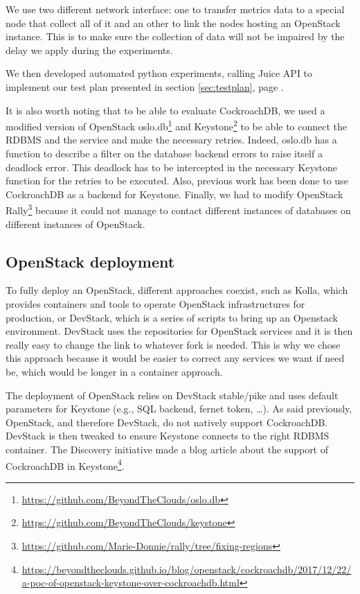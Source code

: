 We use two different network interface: one to transfer metrics data to a special node that collect all of it and an other to link the nodes hosting an OpenStack instance. This is to make sure the collection of data will not be impaired by the delay we apply during the experiments.

We then developed automated python experiments, calling Juice API to implement our test plan presented in section \ref{sec:testplan}, page \pageref{sec:testplan}.

It is also worth noting that to be able to evaluate CockroachDB, we used a modified version of OpenStack oslo.db\footnote{\url{https://github.com/BeyondTheClouds/oslo.db}} and Keystone\footnote{\url{https://github.com/BeyondTheClouds/keystone}} to be able to connect the RDBMS and the service and make the necessary retries. Indeed, oslo.db has a function to describe a filter on the database backend errors to raise itself a deadlock error. This deadlock has to be intercepted in the necessary Keystone function for the retries to be executed. Also, previous work has been done to use CockroachDB as a backend for Keystone. Finally, we had to modify OpenStack Rally\footnote{\url{https://github.com/Marie-Donnie/rally/tree/fixing-regions}} because it could not manage to contact different instances of databases on different instances of OpenStack.

\subsection{OpenStack deployment}

To fully deploy an OpenStack, different approaches coexist, such as Kolla, which provides containers and tools to operate OpenStack infrastructures for production, or DevStack, which is a series of scripts to bring up an Openstack environment. DevStack uses the repositories for OpenStack services and it is then really easy to change the link to whatever fork is needed. This is why we chose this approach because it would be easier to correct any services we want if need be, which would be longer in a container approach.

The deployment of OpenStack relies on DevStack stable/pike and uses default parameters for Keystone (e.g., SQL backend, fernet token, \dots). As said previously, OpenStack, and therefore DevStack, do not natively support CockroachDB. DevStack is then tweaked to ensure Keystone connects to the right RDBMS container. The Discovery initiative made a blog article about the support of CockroachDB in Keystone\footnote{\url{https://beyondtheclouds.github.io/blog/openstack/cockroachdb/2017/12/22/a-poc-of-openstack-keystone-over-cockroachdb.html}}.

